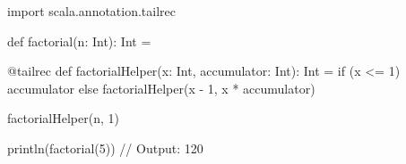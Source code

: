 import scala.annotation.tailrec

def factorial(n: Int): Int = {
  @tailrec
  def factorialHelper(x: Int, accumulator: Int): Int = {
    if (x <= 1) accumulator
    else factorialHelper(x - 1, x * accumulator)
  }
  
  factorialHelper(n, 1)
}

println(factorial(5)) // Output: 120